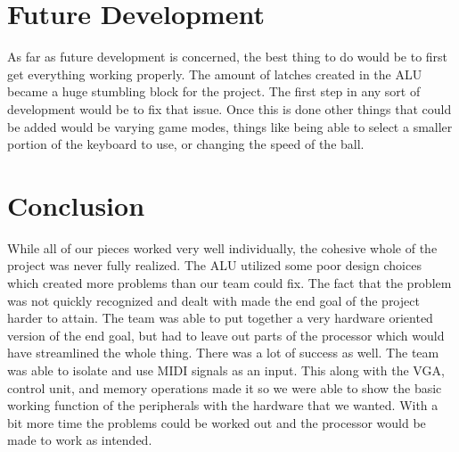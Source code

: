 \documentclass[onecolumn, 12pt]{IEEEtran}
\begin{document}
\section{Future Development}
	As far as future development is concerned, the best thing to do would be to first get everything working properly.  The amount of latches created in the ALU became a huge stumbling block for the project.  The first step in any sort of development would be to fix that issue.  Once this is done other things that could be added would be varying game modes, things like being able to select a smaller portion of the keyboard to use, or changing the speed of the ball.
\section{Conclusion}
	While all of our pieces worked very well individually, the cohesive whole of the project was never fully realized.  The ALU utilized some poor design choices which created more problems than our team could fix.  The fact that the problem was not quickly recognized and dealt with made the end goal of the project harder to attain.  The team was able to put together a very hardware oriented version of the end goal, but had to leave out parts of the processor which would have streamlined the whole thing.
	There was a lot of success as well.  The team was able to isolate and use MIDI signals as an input.  This along with the VGA, control unit, and memory operations made it so we were able to show the basic working function of the peripherals with the hardware that we wanted.  With a bit more time the problems could be worked out and the processor would be made to work as intended. 
	
\end{document}
